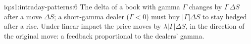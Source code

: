 \begin{solution}{iq:s1:intraday-patterns:6}
The delta of a book with gamma $\Gamma$ changes by $\Gamma\,\Delta S$ after a move $\Delta S$; a short-gamma dealer ($\Gamma < 0$) must buy $|\Gamma|\Delta S$ to stay
hedged after a rise. Under linear impact the price moves by $\lambda |\Gamma| \Delta S$, in the direction of the original move: a feedback proportional to the
dealers' gamma.
\end{solution}
